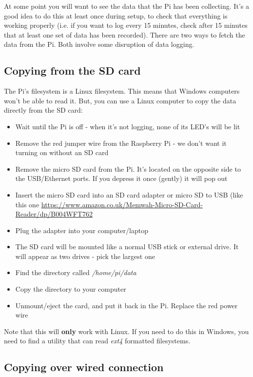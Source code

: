 \documentclass[10pt]{article}
\begin{document}
At some point you will want to see the data that the Pi has been collecting. It's a good idea to do this at least once during setup, to check that everything is working properly (i.e. if you want to log every 15 minutes, check after 15 minutes that at least one set of data has been recorded). There are two ways to fetch the data from the Pi. Both involve some disruption of data logging.

\subsection{Copying from the SD card}

The Pi's filesystem is a Linux filesystem. This means that Windows computers won't be able to read it. But, you can use a Linux computer to copy the data directly from the SD card:

\begin{itemize}
 \item Wait until the Pi is off - when it's not logging, none of its LED's will be lit 
 \item Remove the red jumper wire from the Raspberry Pi - we don't want it turning on without an SD card
 \item Remove the micro SD card from the Pi. It's located on the opposite side to the USB/Ethernet ports. If you depress it once (gently) it will pop out
 \item Insert the micro SD card into an SD card adapter or micro SD to USB (like this one \url{https://www.amazon.co.uk/Memwah-Micro-SD-Card-Reader/dp/B004WFT762}
 \item Plug the adapter into your computer/laptop
 \item The SD card will be mounted like a normal USB stick or external drive. It will appear as two drives - pick the largest one
 \item Find the directory called \textit{/home/pi/data}
 \item Copy the directory to your computer
 \item Unmount/eject the card, and put it back in the Pi. Replace the red power wire
\end{itemize}

Note that this will \textbf{only} work with Linux. If you need to do this in Windows, you need to find a utility that can read \textit{ext4} formatted filesystems.

\subsection{Copying over wired connection}
\end{document}
